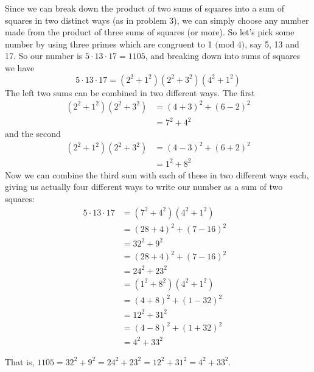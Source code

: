 \documentclass{scrartcl}
\renewcommand{\mod}[1]{\text{ (mod $#1$)}}
\begin{document}
Since we can break down the product of two sums of squares into a sum of squares in two distinct ways (as in problem 3), we can simply choose any number made from the product of three sums of squares (or more). So let's pick some number by using three primes which are congruent to 1$\mod{4}$, say 5, 13 and 17. So our number is $5\cdot13\cdot17=1105$, and breaking down into sums of squares we have
$$5\cdot13\cdot17 = \left(2^2 + 1^2\right)\left(2^2 + 3^2\right)\left(4^2+1^2\right)$$
The left two sums can be combined in two different ways. The first
\begin{align*}
  \left(2^2 + 1^2\right)\left(2^2 + 3^2\right) &= \left(4 + 3\right)^2 + \left(6 - 2\right)^2\\
  &= 7^2 + 4^2
\end{align*}
and the second
\begin{align*}
  \left(2^2 + 1^2\right)\left(2^2 + 3^2\right) &= \left(4 - 3\right)^2 + \left(6 + 2\right)^2\\
  &= 1^2 + 8^2
\end{align*}
Now we can combine the third sum with each of these in two different ways each, giving us actually four different ways to write our number as a sum of two squares:
\begin{align*}
  5\cdot13\cdot17 &=  \left(7^2 + 4^2\right)\left(4^2+1^2\right)\\
  &= \left(28 + 4\right)^2 + \left(7 - 16\right)^2\\
  &= 32^2 + 9^2&\\
  &= \left(28 + 4\right)^2 + \left(7 - 16\right)^2\\
  &= 24^2 + 23^2\\
  &= \left(1^2 + 8^2\right)\left(4^2+1^2\right)\\
  &= \left(4 + 8\right)^2 + \left(1 - 32\right)^2\\
  &= 12^2 + 31^2\\
  &= \left(4 - 8\right)^2 + \left(1 + 32\right)^2\\
  &= 4^2 + 33^2
\end{align*}

That is, $1105 = 32^2 + 9^2 = 24^2 + 23^2 = 12^2 + 31^2 = 4^2 + 33^2$.
\end{document}
